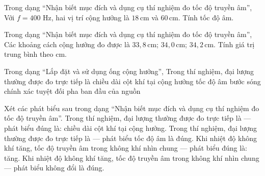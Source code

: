\begin{ex}
Trong dạng “Nhận biết mục đích và dụng cụ thí nghiệm đo tốc độ truyền âm”, Với $f=400$ Hz, hai vị trí cộng hưởng là $18\,\text{cm}$ và $60\,\text{cm}$. Tính tốc độ âm.
\choiceTF

\end{ex}

\begin{ex}
Trong dạng “Nhận biết mục đích và dụng cụ thí nghiệm đo tốc độ truyền âm”, Các khoảng cách cộng hưởng đo được là $33,8\,\text{cm}$; $34,0\,\text{cm}$; $34,2\,\text{cm}$. Tính giá trị trung bình theo cm.
\end{ex}

\begin{ex}
Trong dạng “Lắp đặt và sử dụng ống cộng hưởng”, Trong thí nghiệm, đại lượng thường được đo trực tiếp là
\choice
{\True chiều dài cột khí tại cộng hưởng}
{tốc độ âm}
{bước sóng chính xác tuyệt đối}
{pha ban đầu của nguồn}
\end{ex}

\begin{ex}
Xét các phát biểu sau trong dạng “Nhận biết mục đích và dụng cụ thí nghiệm đo tốc độ truyền âm”.
\choiceTF
{\True Trong thí nghiệm, đại lượng thường được đo trực tiếp là — phát biểu đúng là: chiều dài cột khí tại cộng hưởng.}
{Trong thí nghiệm, đại lượng thường được đo trực tiếp là — phát biểu tốc độ âm là đúng.}
{\True Khi nhiệt độ không khí tăng, tốc độ truyền âm trong không khí nhìn chung — phát biểu đúng là: tăng.}
{Khi nhiệt độ không khí tăng, tốc độ truyền âm trong không khí nhìn chung — phát biểu không đổi là đúng.}
\end{ex}

